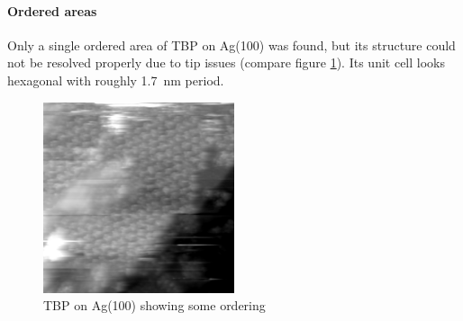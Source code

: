 \label{appendix:TBP}
\paragraph{Ordered areas}
Only a single ordered area of TBP on Ag(100) was found, but its structure could not be resolved properly due to tip issues (compare figure \ref{fig:hex-TBP-Ag100}). Its unit cell looks hexagonal with roughly \SI{1.7} {\nano \meter} period. 

\begin{figure}[h]
	\centering
	\includegraphics[width=0.5\textwidth]{./images/F151007-112800}
	\caption{TBP on Ag(100) showing some ordering}
	\label{fig:hex-TBP-Ag100}
\end{figure}
